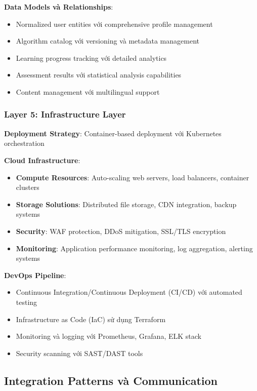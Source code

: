\textbf{Data Models và Relationships}:
\begin{itemize}
    \item Normalized user entities với comprehensive profile management
    \item Algorithm catalog với versioning và metadata management
    \item Learning progress tracking với detailed analytics
    \item Assessment results với statistical analysis capabilities
    \item Content management với multilingual support
\end{itemize}

\subsubsection{Layer 5: Infrastructure Layer}

\textbf{Deployment Strategy}: Container-based deployment với Kubernetes orchestration

\textbf{Cloud Infrastructure}:
\begin{itemize}
    \item \textbf{Compute Resources}: Auto-scaling web servers, load balancers, container clusters
    \item \textbf{Storage Solutions}: Distributed file storage, CDN integration, backup systems
    \item \textbf{Security}: WAF protection, DDoS mitigation, SSL/TLS encryption
    \item \textbf{Monitoring}: Application performance monitoring, log aggregation, alerting systems
\end{itemize}

\textbf{DevOps Pipeline}:
\begin{itemize}
    \item Continuous Integration/Continuous Deployment (CI/CD) với automated testing
    \item Infrastructure as Code (IaC) sử dụng Terraform
    \item Monitoring và logging với Prometheus, Grafana, ELK stack
    \item Security scanning với SAST/DAST tools
\end{itemize}

\subsection{Integration Patterns và Communication}
\label{subsec:integration-patterns}

